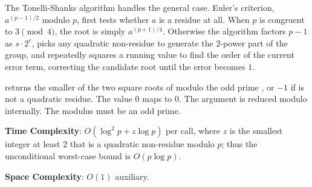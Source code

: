 The Tonelli-Shanks algorithm handles the general case. Euler's criterion, $a^{(p-1)/2}$ modulo $p$, first tests whether $a$ is a residue at all. When $p$ is congruent to $3 \pmod{4}$, the root is simply $a^{(p+1)/4}$. Otherwise the algorithm factors $p - 1$ as $s \cdot 2^e$, picks any quadratic non-residue to generate the $2$-power part of the group, and repeatedly squares a running value to find the order of the current error term, correcting the candidate root until the error becomes $1$.

\begin{compactitem}
  \item {} returns the smaller of the two square roots of  modulo the odd prime , or $-1$ if  is not a quadratic residue. The value $0$ maps to $0$. The argument  is reduced modulo  internally. The modulus  must be an odd prime.
\end{compactitem}

\textbf{Time Complexity}: $O(\log^{2} p + z \log p)$ per call, where $z$ is the smallest integer at least $2$ that is a quadratic non-residue modulo $p$; thus the unconditional worst-case bound is $O(p \log p)$.

\textbf{Space Complexity}: $O(1)$ auxiliary.

